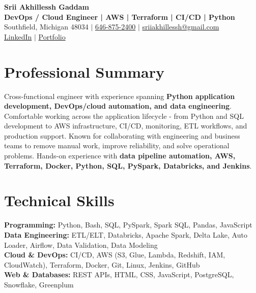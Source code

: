 \documentclass[letterpaper,10pt]{article}
\begin{document}
\fontsize{9.35pt}{10.45pt}\selectfont

\begin{center}
    {\LARGE \textbf{Srii Akhillessh Gaddam}} \\[-1pt]
    \textbf{DevOps / Cloud Engineer | AWS | Terraform | CI/CD | Python} \\[2pt]
    Southfield, Michigan 48034 $|$
    \href{tel:6468752400}{646-875-2400} $|$
    \href{mailto:sriiakhillessh@gmail.com}{sriiakhillessh@gmail.com} \\[1pt]
    \href{https://www.linkedin.com/in/srii-akhiilessh-gaddam-b48668191/}{LinkedIn} $|$
    \href{https://sriiakhillesshg.github.io/portfolio/}{Portfolio}
\end{center}
\vspace{-8pt}

\section{Professional Summary}
\small{Cross-functional engineer with experience spanning \textbf{Python application development, DevOps/cloud automation, and data engineering}. Comfortable working across the application lifecycle - from Python and SQL development to AWS infrastructure, CI/CD, monitoring, ETL workflows, and production support. Known for collaborating with engineering and business teams to remove manual work, improve reliability, and solve operational problems. Hands-on experience with \textbf{data pipeline automation, AWS, Terraform, Docker, Python, SQL, PySpark, Databricks, and Jenkins}.}

\section{Technical Skills}
\small{
\textbf{Programming:} Python, Bash, SQL, PySpark, Spark SQL, Pandas, JavaScript \\
\textbf{Data Engineering:} ETL/ELT, Databricks, Apache Spark, Delta Lake, Auto Loader, Airflow, Data Validation, Data Modeling \\
\textbf{Cloud \& DevOps:} CI/CD, AWS (S3, Glue, Lambda, Redshift, IAM, CloudWatch), Terraform, Docker, Git, Linux, Jenkins, GitHub \\
\textbf{Web \& Databases:} REST APIs, HTML, CSS, JavaScript, PostgreSQL, Snowflake, Greenplum
}
\end{document}
